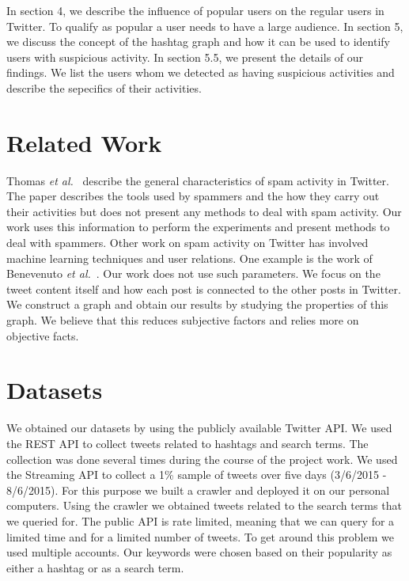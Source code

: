 \documentclass[journal, a4paper, 12pt]{article}
\begin{document}
In section 4, we describe the influence of popular users on the regular users in Twitter. To qualify as popular a user needs to have a large audience. In section 5, we discuss the concept of the hashtag graph and how it can be used to identify users with suspicious activity. In section 5.5, we present the details of our findings. We list the users whom we detected as having suspicious activities and describe the sepecifics of their activities.


\section{Related Work}

Thomas \textit{et al.}~\cite{thomas_paper} describe the general characteristics of spam activity in Twitter. The paper describes the tools used by spammers and the how they carry out their activities but does not present any methods to deal with spam activity. Our work uses this information to perform the experiments and present methods to deal with spammers. Other work on spam activity on Twitter has involved machine learning techniques and user relations. One example is the work of Benevenuto \textit{et al.}~\cite{benevenuto_paper}. Our work does not use such parameters. We focus on the tweet content itself and how each post is connected to the other posts in Twitter. We construct a graph and obtain our results by studying the properties of this graph. We believe that this reduces subjective factors and relies more on objective facts.  

\section{Datasets}

We obtained our datasets by using the publicly available Twitter API. We used the REST API to collect tweets related to hashtags and search terms. The collection was done several times during the course of the project work. We used the Streaming API to collect a 1\% sample of tweets over five days (3/6/2015 - 8/6/2015). For this purpose we built a crawler and deployed it on our personal computers. Using the crawler we obtained tweets related to the search terms that we queried for. The public API is rate limited, meaning that we can query for a limited time and for a limited number of tweets. To get around this problem we used multiple accounts. Our keywords were chosen based on their popularity as either a hashtag or as a search term. \\
\end{document}
